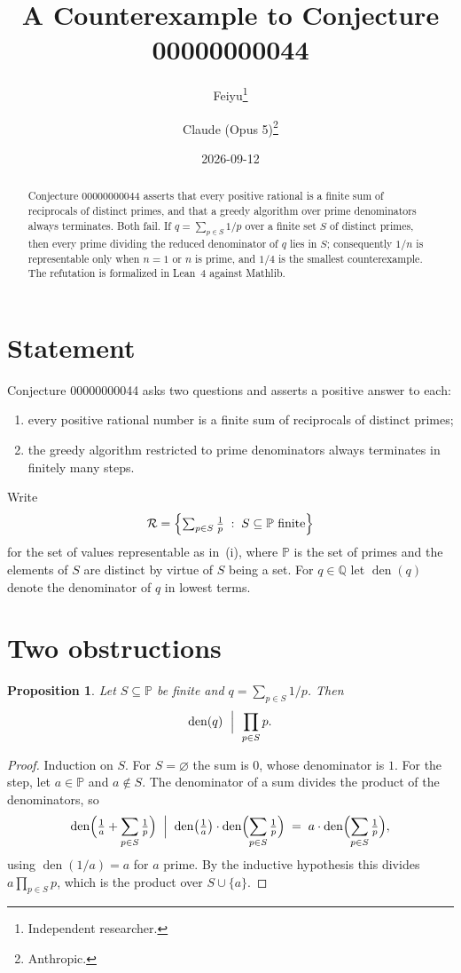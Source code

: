 \documentclass[11pt]{article}
\title{A Counterexample to Conjecture 00000000044}
\author{%
  Feiyu\thanks{Independent researcher.}
  \and
  Claude (Opus 5)\thanks{Anthropic.}%
}
\date{2026-09-12}
\theoremstyle{plain}
\newtheorem{proposition}[theorem]{Proposition}
\theoremstyle{remark}
\begin{document}
\maketitle

\begin{abstract}
Conjecture 00000000044 asserts that every positive rational is a finite sum of
reciprocals of distinct primes, and that a greedy algorithm over prime
denominators always terminates. Both fail. If $q=\sum_{p\in S}1/p$ over a
finite set $S$ of distinct primes, then every prime dividing the reduced
denominator of $q$ lies in $S$; consequently $1/n$ is representable only when
$n=1$ or $n$ is prime, and $1/4$ is the smallest counterexample. The refutation
is formalized in Lean~4 against Mathlib.
\end{abstract}

\section{Statement}

Conjecture 00000000044 asks two questions and asserts a positive answer to
each:
\begin{enumerate}
  \item[(i)] every positive rational number is a finite sum of reciprocals of
    distinct primes;
  \item[(ii)] the greedy algorithm restricted to prime denominators always
    terminates in finitely many steps.
\end{enumerate}
Write
\[
  \mathcal R=\Bigl\{\textstyle\sum_{p\in S}\tfrac1p\;:\;S\subseteq\mathbb P
  \text{ finite}\Bigr\}
\]
for the set of values representable as in~(i), where $\mathbb P$ is the set of
primes and the elements of $S$ are distinct by virtue of $S$ being a set. For
$q\in\mathbb Q$ let $\operatorname{den}(q)$ denote the denominator of $q$ in
lowest terms.

\section{Two obstructions}

\begin{proposition}\label{prop:dvd}
Let $S\subseteq\mathbb P$ be finite and $q=\sum_{p\in S}1/p$. Then
\[
  \operatorname{den}(q)\ \Bigm|\ \prod_{p\in S}p .
\]
\end{proposition}

\begin{proof}
Induction on $S$. For $S=\varnothing$ the sum is $0$, whose denominator is $1$.
For the step, let $a\in\mathbb P$ and $a\notin S$. The denominator of a sum
divides the product of the denominators, so
\[
  \operatorname{den}\Bigl(\tfrac1a+\sum_{p\in S}\tfrac1p\Bigr)
  \;\Bigm|\;
  \operatorname{den}\bigl(\tfrac1a\bigr)\cdot
  \operatorname{den}\Bigl(\sum_{p\in S}\tfrac1p\Bigr)
  \;=\;a\cdot\operatorname{den}\Bigl(\sum_{p\in S}\tfrac1p\Bigr),
\]
using $\operatorname{den}(1/a)=a$ for $a$ prime. By the inductive hypothesis
this divides $a\prod_{p\in S}p$, which is the product over $S\cup\{a\}$.
\end{proof}
\end{document}
